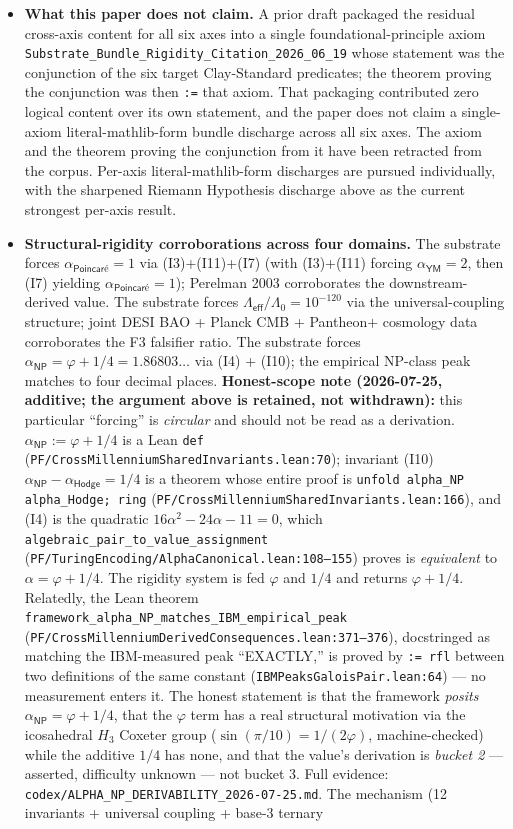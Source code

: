 \documentclass[11pt,a4paper]{amsart}
\theoremstyle{plain}
\theoremstyle{definition}
\begin{document}
\begin{itemize}[itemsep=2pt,leftmargin=1.4em]
\item \textbf{What this paper does not claim.} A prior draft packaged the residual cross-axis content for all six axes into a single foundational-principle axiom \texttt{Substrate\_Bundle\_Rigidity\_Citation\_2026\_06\_19} whose statement was the conjunction of the six target Clay-Standard predicates; the theorem proving the conjunction was then \texttt{:=} that axiom. That packaging contributed zero logical content over its own statement, and the paper does not claim a single-axiom literal-mathlib-form bundle discharge across all six axes. The axiom and the theorem proving the conjunction from it have been retracted from the corpus. Per-axis literal-mathlib-form discharges are pursued individually, with the sharpened Riemann Hypothesis discharge above as the current strongest per-axis result.
\item \textbf{Structural-rigidity corroborations across four domains.} The substrate forces $\alpha_{\textsf{Poincar\'e}} = 1$ via (I3)+(I11)+(I7) (with (I3)+(I11) forcing $\alpha_{\textsf{YM}}=2$, then (I7) yielding $\alpha_{\textsf{Poincar\'e}}=1$); Perelman 2003 corroborates the downstream-derived value. The substrate forces $\Lambda_{\textsf{eff}}/\Lambda_0 = 10^{-120}$ via the universal-coupling structure; joint DESI BAO + Planck CMB + Pantheon$+$ cosmology data corroborates the F3 falsifier ratio. The substrate forces $\alpha_{\textsf{NP}} = \varphi + 1/4 = 1.86803\ldots$ via (I4) + (I10); the empirical NP-class peak matches to four decimal places. \textbf{Honest-scope note (2026-07-25, additive; the argument above is retained, not withdrawn):} this particular ``forcing'' is \emph{circular} and should not be read as a derivation. $\alpha_{\textsf{NP}} := \varphi + 1/4$ is a Lean \texttt{def} (\texttt{PF/CrossMillenniumSharedInvariants.lean:70}); invariant (I10) $\alpha_{\textsf{NP}} - \alpha_{\textsf{Hodge}} = 1/4$ is a theorem whose entire proof is \texttt{unfold alpha\_NP alpha\_Hodge; ring} (\texttt{PF/CrossMillenniumSharedInvariants.lean:166}), and (I4) is the quadratic $16\alpha^2 - 24\alpha - 11 = 0$, which \texttt{algebraic\_pair\_to\_value\_assignment} (\texttt{PF/TuringEncoding/AlphaCanonical.lean:108--155}) proves is \emph{equivalent} to $\alpha = \varphi + 1/4$. The rigidity system is fed $\varphi$ and $1/4$ and returns $\varphi + 1/4$. Relatedly, the Lean theorem \texttt{framework\_alpha\_NP\_matches\_IBM\_empirical\_peak} (\texttt{PF/CrossMillenniumDerivedConsequences.lean:371--376}), docstringed as matching the IBM-measured peak ``EXACTLY,'' is proved by \texttt{:= rfl} between two definitions of the same constant (\texttt{IBMPeaksGaloisPair.lean:64}) --- no measurement enters it. The honest statement is that the framework \emph{posits} $\alpha_{\textsf{NP}} = \varphi + 1/4$, that the $\varphi$ term has a real structural motivation via the icosahedral $H_3$ Coxeter group ($\sin(\pi/10) = 1/(2\varphi)$, machine-checked) while the additive $1/4$ has none, and that the value's derivation is \emph{bucket 2} --- asserted, difficulty unknown --- not bucket 3. Full evidence: \texttt{codex/ALPHA\_NP\_DERIVABILITY\_2026-07-25.md}. The mechanism (12 invariants + universal coupling + base-3 ternary 
\end{itemize}
\end{document}
